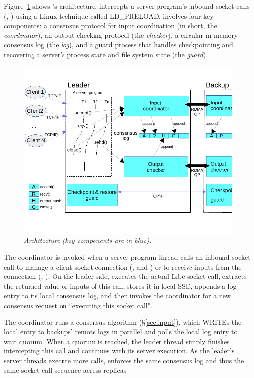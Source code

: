 Figure~\ref{fig:arch} shows \xxx's architecture. \xxx intercepts a server 
program's inbound socket calls (\eg, \recv) using a Linux technique called 
LD\_PRELOAD. \xxx involves four key components: a \paxos consensus protocol for 
input coordination (in short, the \emph{coordinator}), an output checking 
protocol (the \emph{checker}), a circular in-memory consensus log (the 
\emph{log}), and a guard process that handles checkpointing and recovering a 
server's process state and file system state (the \emph{guard}).

\begin{figure}[t]
\centering
\vspace{-.15in}
\includegraphics[width=.48\textwidth]{figures/arch}
\vspace{-.30in}
\caption{\em \xxx Architecture (key components are in
  blue).}
\vspace{-.2in}
  \label{fig:arch}
\end{figure}


The coordinator is invoked when a server program thread calls an inbound socket 
call to manage a client socket connection (\eg, \accept and \close) or to 
receive inputs from the connection (\eg, \recv). On the leader side, \xxx 
executes the actual Libc socket call, extracts the returned value or inputs of 
this call, stores it in local SSD, appends a log entry to its local consensus 
log, and then invokes the coordinator for a new consensus request on 
``executing this socket call".

The coordinator runs a consensus algorithm (\S\ref{sec:input}), which WRITEs 
the local entry to backups' remote logs in parallel and polls the local log 
entry to wait quorum. When a quorum is reached, the leader thread simply 
finishes intercepting this call and continues with its server execution. As 
the leader's server threads execute more calls, \xxx enforces the same 
consensus log and thus the same socket call sequence across replicas.

